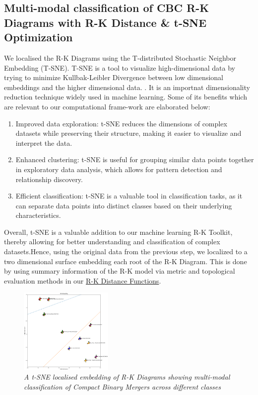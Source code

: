  \subsection{Multi-modal classification of CBC R-K Diagrams with R-K Distance \& t-SNE Optimization}

We localised the R-K Diagrams using the T-distributed Stochastic Neighbor Embedding (T-SNE). T-SNE is a tool to visualize high-dimensional data by trying to minimize Kullbak-Leibler Divergence between low dimensional embeddings and the higher dimensional data. \cite{sklearn.manifold.tsne_2014}. It is an importnat dimensionality reduction technique widely used in machine learning. Some of its benefits which are relevant to our computational frame-work are elaborated below:

\begin{enumerate}
    
 \item Improved data exploration: t-SNE reduces the dimensions of complex datasets while preserving their structure, making it easier to visualize and interpret the data.
 \item Enhanced clustering: t-SNE is useful for grouping similar data points together in exploratory data analysis, which allows for pattern detection and relationship discovery.
 \item Efficient classification: t-SNE is a valuable tool in classification tasks, as it can separate data points into distinct classes based on their underlying characteristics.

\end{enumerate}

Overall, t-SNE is a valuable addition to our machine learning R-K Toolkit, thereby allowing for better understanding and classification of complex datasets.Hence, using the original data from the previous step, we localized to a two dimensional surface embedding each root of the R-K Diagram. This is done by using summary information of the R-K model via metric and topological evaluation methods in our \hyperref[sec:rk_distance]{R-K Distance Functions}.

\begin{figure}[H]
 	\centering
        \includegraphics[width=0.4\textwidth]{images/ligo_multimodal_class_tsne.png}
	\caption{\textit{A t-SNE localised embedding of R-K Diagrams showing multi-modal classification of Compact Binary Mergers across different classes}}
	\label{fig:ligo_tsne}
\end{figure}

